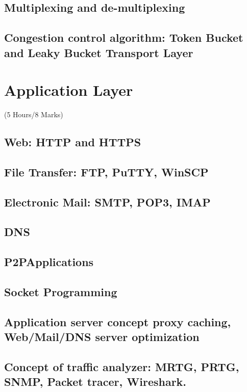 \documentclass[12pt]{article}
\begin{document}
	\subsection{Multiplexing and de-multiplexing}
	\subsection{Congestion control algorithm: Token Bucket and Leaky Bucket Transport Layer}

	\pagebreak

\section{Application Layer}
	\begin{center}(5 Hours/8 Marks)\end{center}
	\subsection{Web: HTTP and HTTPS}
	\subsection{File Transfer: FTP, PuTTY, WinSCP}
	\subsection{Electronic Mail: SMTP, POP3, IMAP}
	\subsection{DNS}
	\subsection{P2PApplications}
	\subsection{Socket Programming}
	\subsection{Application server concept proxy caching, Web/Mail/DNS server optimization}
	\subsection{Concept of traffic analyzer: MRTG, PRTG, SNMP, Packet tracer, Wireshark.}

	\pagebreak
\end{document}
